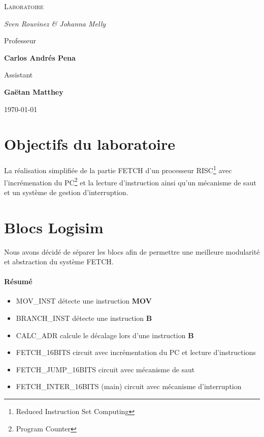 \documentclass[a4paper]{article} %
\begin{document}
\renewcommand{\labelitemi}{$\bullet$}
\renewcommand{\labelitemii}{$\cdot$}
\renewcommand{\labelitemiii}{$\diamond$}
\renewcommand{\labelitemiv}{$\ast$}

\begin{titlepage}
	\centering
	
	{\scshape\LARGE \color{Monokaimagenta} Laboratoire \\  \par}
	
	\vspace{1cm}
	
	{\Large\itshape Sven Rouvinez \& Johanna Melly\par}
	
	\vfill
	Professeur\par
	\textbf{Carlos Andrés Pena} \par%
	\vspace{1cm}
	Assistant\par
	\textbf{Gaëtan Matthey}
	
	\vfill

	{\large \today\par}
	
\end{titlepage}

\section{Objectifs du laboratoire}
La réalisation simplifiée de la partie FETCH d'un processeur RISC\footnote{Reduced Instruction Set Computing} avec l'incrémenation du PC\footnote{Program Counter} et la lecture d'instruction ainsi qu'un mécanisme de saut et un système de gestion d'interruption.

\section{Blocs Logisim}
Nous avons décidé de séparer les blocs afin de permettre une meilleure modularité et abstraction du système FETCH.\\
\paragraph{Résumé}
\begin{itemize}
    \item     MOV\_INST détecte une instruction \textbf{MOV}
    \item     BRANCH\_INST détecte une instruction \textbf{B}
    \item     CALC\_ADR calcule le décalage lors d'une instruction \textbf{B}
    \item     FETCH\_16BITS circuit avec incrémentation du PC et lecture d'instructions
    \item     FETCH\_JUMP\_16BITS circuit avec mécanisme de saut
    \item     FETCH\_INTER\_16BITS (main) circuit avec mécanisme d'interruption
\end{itemize}
\end{document}
